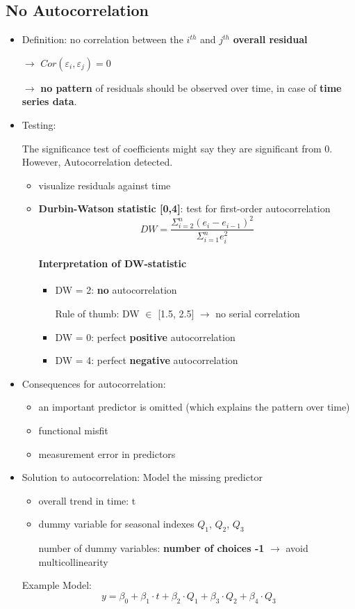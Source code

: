 \subsection{No Autocorrelation}
\begin{itemize}
	\item Definition: no correlation between the $i^{th}$ and $j^{th}$ \textbf{overall residual}
	
	$\rightarrow$ $Cor(\varepsilon_i, \varepsilon_j) = 0$
	
	$\rightarrow$ \textbf{no pattern} of residuals should be observed over time, in case of \textbf{time series data}.
	
	
	\item Testing:
	
	The significance test of coefficients might say they are significant from 0. However, Autocorrelation detected. 
	\begin{itemize}
		\item visualize residuals against time
		\item \textbf{Durbin-Watson statistic [0,4]}: test for first-order autocorrelation
		$$DW = \frac{\Sigma_{i=2}^n (e_i - e_{i-1})^2}{\Sigma_{i=1}^n e_i^2}$$
		\paragraph{Interpretation of DW-statistic}
		\begin{itemize}
			\item DW = 2: \textbf{no} autocorrelation
			
			Rule of thumb: DW $\in$ [1.5, 2.5] $\rightarrow$ no serial correlation
			\item DW = 0: perfect \textbf{positive} autocorrelation
			\item DW = 4: perfect \textbf{negative} autocorrelation
		\end{itemize}
	\end{itemize}

	\item Consequences for autocorrelation:
	\begin{itemize}
		\item an important predictor is omitted (which explains the pattern over time)
		\item functional misfit 
		\item measurement error in predictors
	\end{itemize}

	\item Solution to autocorrelation: Model the missing predictor
	\begin{itemize}
		\item overall trend in time: t 
		\item dummy variable for seasonal indexes $Q_1$, $Q_2$, $Q_3$
		
		number of dummy variables: \textbf{number of choices -1} $\rightarrow$ avoid multicollinearity
	\end{itemize}

	Example Model: 
	$$y = \beta_0 + \beta_1\cdot t + \beta_2 \cdot Q_1 + \beta_3 \cdot Q_2 + \beta_4 \cdot Q_3$$
\end{itemize}

